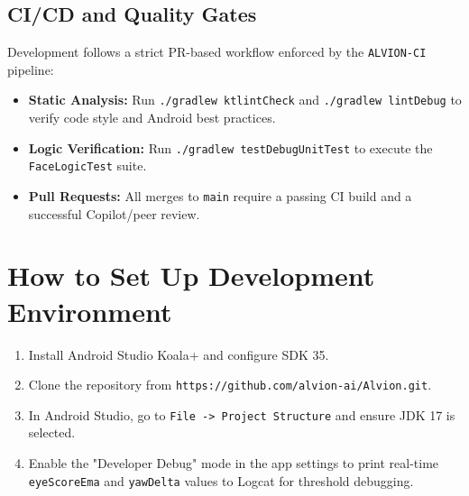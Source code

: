 \documentclass[11pt]{report}
\begin{document}
\subsection{CI/CD and Quality Gates}
Development follows a strict PR-based workflow enforced by the \texttt{ALVION-CI} pipeline:
\begin{itemize}
    \item \textbf{Static Analysis:} Run \texttt{./gradlew ktlintCheck} and \texttt{./gradlew lintDebug} to verify code style and Android best practices.
    \item \textbf{Logic Verification:} Run \texttt{./gradlew testDebugUnitTest} to execute the \texttt{FaceLogicTest} suite.
    \item \textbf{Pull Requests:} All merges to \texttt{main} require a passing CI build and a successful Copilot/peer review.
\end{itemize}

\section{How to Set Up Development Environment}
\begin{enumerate}
    \item Install Android Studio Koala+ and configure SDK 35.
    \item Clone the repository from \texttt{https://github.com/alvion-ai/Alvion.git}.
    \item In Android Studio, go to \texttt{File -> Project Structure} and ensure JDK 17 is selected.
    \item Enable the "Developer Debug" mode in the app settings to print real-time \texttt{eyeScoreEma} and \texttt{yawDelta} values to Logcat for threshold debugging.
\end{enumerate}

\end{document}

